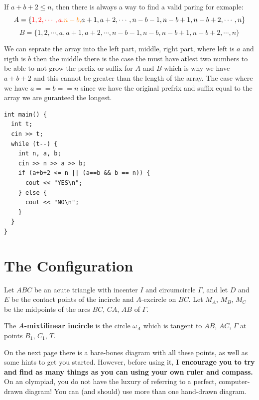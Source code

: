 \documentclass[11pt]{scrartcl}
\begin{document}
\begin{solution}
  If $a + b + 2 \leq n$, then there is always a way to find a valid paring for exmaple:
    \[
        A = \{\textcolor{red}{1,2,\cdots, a,} \textcolor{orange}{n-b,} a+1, a+2, \cdots, n-b-1, n-b+1, n-b+2, \cdots, n\}
    \]
    \[
      B = \{1,2,\cdots,a,a+1,a+2,\cdots,n-b-1,n-b,n-b+1,n-b+2,\cdots, n\}
    \]

    We can seprate the array into the left part, middle, right part, where left is $a$ and rigth is $b$ then the middle there is the
    case the must have atlest two numbers to be able to not grow the prefix or suffix for $A$  and $B$ which is why we have $a + b + 2$ and this 
    cannot be greater than the length of the array. The case where we have $a == b == n$ since we have the original prefrix and suffix equal to the array 
    we are guranteed the longest. 

\begin{lstlisting}
int main() {
  int t;
  cin >> t;
  while (t--) {
    int n, a, b;
    cin >> n >> a >> b;
    if (a+b+2 <= n || (a==b && b == n)) {
      cout << "YES\n";
    } else {
      cout << "NO\n";
    }
  }
}
\end{lstlisting}
\end{solution}

\newpage

\section{The Configuration}
\begin{mdframed}
  Let $ABC$ be an acute triangle with incenter $I$ and circumcircle $\Gamma$,
  and let $D$ and $E$ be the contact points of the incircle and $A$-excircle on $BC$.
  Let $M_A$, $M_B$, $M_C$ be the midpoints of the arcs $BC$, $CA$, $AB$ of $\Gamma$.

  The \textbf{$\boldmath A$-mixtilinear incircle} is the circle $\omega_A$ which is
  tangent to $AB$, $AC$, $\Gamma$ at points $B_1$, $C_1$, $T$.
\end{mdframed}

On the next page there is a bare-bones diagram with all these points,
as well as some hints to get you started.
However, before using it, \textbf{I encourage you to try and find as many things as you can
using your own ruler and compass.}
On an olympiad, you do not have the luxury of referring to a perfect, computer-drawn diagram!
You can (and should) use more than one hand-drawn diagram.

\eject
\end{document}
